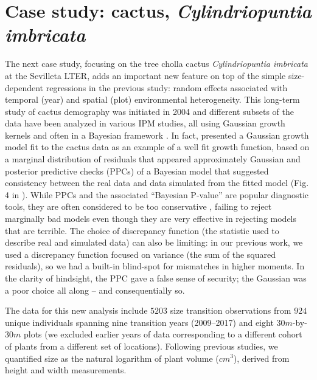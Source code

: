 \documentclass[12pt]{article}
\begin{document}
\clearpage   

\section{Case study: cactus, \emph{Cylindriopuntia imbricata}}
The next case study, focusing on the tree cholla cactus \emph{Cylindriopuntia imbricata} at the Sevilleta LTER, adds an important new
feature on top of the simple size-dependent regressions in the previous study: random effects associated with temporal (year) and spatial (plot) environmental heterogeneity. 
This long-term study of cactus demography was initiated in 2004 and different subsets of the data have been analyzed in various IPM studies, all using Gaussian growth kernels and often in a Bayesian framework \citep{miller2009impacts,czachurademographic,compagnoni2016effect,ohm2014balancing,elderd2016quantifying}.
In fact, \citep{elderd2016quantifying} presented a Gaussian growth model fit to the cactus data as an example of a well fit growth function, based on a marginal distribution of residuals that appeared approximately Gaussian and posterior predictive checks (PPCs) of a Bayesian model that suggested consistency between the real data and data simulated from the fitted model (Fig. 4 in \citep{elderd2016quantifying}). 
While PPCs and the associated ``Bayesian P-value'' are popular diagnostic tools, they are often considered to be too conservative \citep{conn2018guide,zhang2014comparative}, failing to reject marginally bad models even though they are very effective in rejecting models that are terrible.
The choice of discrepancy function (the statistic used to describe real and simulated data) can also be limiting: in our previous work, we used a discrepancy function focused on variance (the sum of the squared residuals), so we had a built-in blind-spot for mismatches in higher moments.
In the clarity of hindsight, the PPC gave a false sense of security; the Gaussian was a poor choice all along -- and consequentially so.

The data for this new analysis include $5203$ size transition observations from $924$ unique individuals spanning nine transition years (2009--2017) and eight $30m$-by-$30m$ plots (we excluded earlier years of data corresponding to a different cohort of plants from a different set of locations). 
Following previous studies, we quantified size as the natural logarithm of plant volume ($cm^3$), derived from height and width measurements. 
\end{document}
